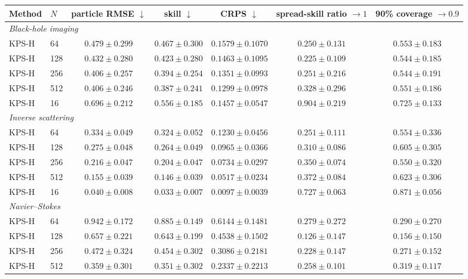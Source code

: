 \small
\begin{tabular}{llccccc}
\toprule
Method & $N$ & \shortstack{particle\\RMSE $\downarrow$} & \shortstack{skill\\$\downarrow$} & \shortstack{CRPS\\$\downarrow$} & \shortstack{spread-skill\\ratio $\to 1$} & \shortstack{90\% coverage\\$\to 0.9$} \\
\midrule
\multicolumn{7}{l}{\itshape Black-hole imaging} \\
KPS-H & 64 & $0.479 \pm 0.299$ & $0.467 \pm 0.300$ & $0.1579 \pm 0.1070$ & $0.250 \pm 0.131$ & $0.553 \pm 0.183$ \\
KPS-H & 128 & $0.432 \pm 0.280$ & $0.423 \pm 0.280$ & $0.1463 \pm 0.1095$ & $0.225 \pm 0.109$ & $0.544 \pm 0.185$ \\
KPS-H & 256 & $0.406 \pm 0.257$ & $0.394 \pm 0.254$ & $0.1351 \pm 0.0993$ & $0.251 \pm 0.216$ & $0.544 \pm 0.191$ \\
KPS-H & 512 & $0.406 \pm 0.246$ & $0.387 \pm 0.241$ & $0.1299 \pm 0.0978$ & $0.328 \pm 0.296$ & $0.551 \pm 0.186$ \\
KPS-H & 16 & $0.696 \pm 0.212$ & $0.556 \pm 0.185$ & $0.1457 \pm 0.0547$ & $0.904 \pm 0.219$ & $0.725 \pm 0.133$ \\
\midrule
\multicolumn{7}{l}{\itshape Inverse scattering} \\
KPS-H & 64 & $0.334 \pm 0.049$ & $0.324 \pm 0.052$ & $0.1230 \pm 0.0456$ & $0.251 \pm 0.111$ & $0.554 \pm 0.336$ \\
KPS-H & 128 & $0.275 \pm 0.048$ & $0.264 \pm 0.049$ & $0.0965 \pm 0.0366$ & $0.310 \pm 0.086$ & $0.605 \pm 0.305$ \\
KPS-H & 256 & $0.216 \pm 0.047$ & $0.204 \pm 0.047$ & $0.0734 \pm 0.0297$ & $0.350 \pm 0.074$ & $0.550 \pm 0.320$ \\
KPS-H & 512 & $0.155 \pm 0.039$ & $0.146 \pm 0.039$ & $0.0517 \pm 0.0234$ & $0.372 \pm 0.084$ & $0.623 \pm 0.306$ \\
KPS-H & 16 & $0.040 \pm 0.008$ & $0.033 \pm 0.007$ & $0.0097 \pm 0.0039$ & $0.727 \pm 0.063$ & $0.871 \pm 0.056$ \\
\midrule
\multicolumn{7}{l}{\itshape Navier--Stokes} \\
KPS-H & 64 & $0.942 \pm 0.172$ & $0.885 \pm 0.149$ & $0.6144 \pm 0.1481$ & $0.279 \pm 0.272$ & $0.290 \pm 0.270$ \\
KPS-H & 128 & $0.657 \pm 0.221$ & $0.643 \pm 0.199$ & $0.4538 \pm 0.1502$ & $0.126 \pm 0.147$ & $0.156 \pm 0.150$ \\
KPS-H & 256 & $0.472 \pm 0.324$ & $0.454 \pm 0.302$ & $0.3086 \pm 0.2181$ & $0.228 \pm 0.147$ & $0.271 \pm 0.152$ \\
KPS-H & 512 & $0.359 \pm 0.301$ & $0.351 \pm 0.302$ & $0.2337 \pm 0.2213$ & $0.258 \pm 0.101$ & $0.319 \pm 0.117$ \\
\bottomrule
\end{tabular}
